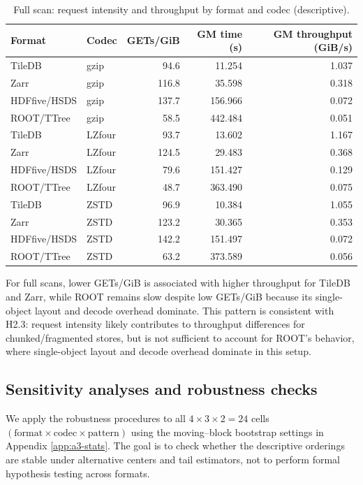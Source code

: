 \documentclass[nomenclature, english, bibtex]{kththesis}
\numberwithin{listing}{chapter}
\begin{document}
\begin{table}[H]
  \centering
  \caption{Full scan: request intensity and throughput by format and codec (descriptive).}
  \label{tab:cross_full_throughput_vs_gets}
  \begin{tabular}{llrrr}
    \toprule
    Format & Codec & GETs/GiB & \gls{GM} time (s) & \gls{GM} throughput (GiB/s) \\
    \midrule
    TileDB & gzip &  94.6 &  11.254 & 1.037 \\
    Zarr   & gzip & 116.8 &  35.598 & 0.318 \\
    \gls{HDFfive}/\gls{HSDS}   & gzip & 137.7 & 156.966 & 0.072 \\
    \gls{ROOT}/\gls{TTree}   & gzip &  58.5 & 442.484 & 0.051 \\
    TileDB & \gls{LZfour}  &  93.7 &  13.602 & 1.167 \\
    Zarr   & \gls{LZfour}  & 124.5 &  29.483 & 0.368 \\
    \gls{HDFfive}/\gls{HSDS}   & \gls{LZfour}  &  79.6 & 151.427 & 0.129 \\
    \gls{ROOT}/\gls{TTree}   & \gls{LZfour}  &  48.7 & 363.490 & 0.075 \\
    TileDB & \gls{ZSTD} &  96.9 &  10.384 & 1.055 \\
    Zarr   & \gls{ZSTD} & 123.2 &  30.365 & 0.353 \\
    \gls{HDFfive}/\gls{HSDS}   & \gls{ZSTD} & 142.2 & 151.497 & 0.072 \\
    \gls{ROOT}/\gls{TTree}   & \gls{ZSTD} &  63.2 & 373.589 & 0.056 \\
    \bottomrule
  \end{tabular}
\end{table}

For full scans, lower GETs/GiB is associated with higher throughput for TileDB and Zarr, while \gls{ROOT} remains slow despite low GETs/GiB because its single-object layout and decode overhead dominate. This pattern is consistent with H2.3: request intensity likely contributes to throughput differences for chunked/fragmented stores, but is not sufficient to account for \gls{ROOT}’s behavior, where single-object layout and decode overhead dominate in this setup.

\subsection{Sensitivity analyses and robustness checks}
We apply the robustness procedures to all $4\times 3\times 2=24$ cells \((\text{format}\times\text{codec}\times\text{pattern})\) using the moving–block bootstrap settings in Appendix \ref{app:a3-stats}. The goal is to check whether the descriptive orderings are stable under alternative centers and tail estimators, not to perform formal hypothesis testing across formats.
\end{document}
